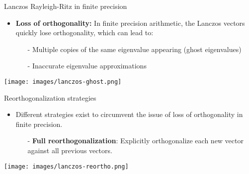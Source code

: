 \documentclass[t,usepdftitle=false]{beamer}
\begin{document}
\begin{frame}{Lanczos Rayleigh-Ritz in finite precision}
\begin{itemize}
\item \textbf{Loss of orthogonality:} In finite precision arithmetic, the Lanczos vectors quickly lose orthogonality, which can lead to:
\begin{itemize}\normalsize
\item[-] Multiple copies of the same eigenvalue appearing (ghost eigenvalues)
\item[-] Inaccurate eigenvalue approximations
\end{itemize}
\end{itemize}
\begin{center}
\texttt{[image: images/lanczos-ghost.png]}
\end{center}
\end{frame}

\begin{frame}{Reorthogonalization strategies}
\begin{itemize}
\item Different strategies exist to circumvent the issue of loss of orthogonality in finite precision.
\begin{itemize}\normalsize
\item[-]\textbf{Full reorthogonalization}: Explicitly orthogonalize each new vector against all previous vectors.
\end{itemize}
\end{itemize}
\begin{center}
\texttt{[image: images/lanczos-reortho.png]}
\end{center}
\end{frame}
\end{document}
